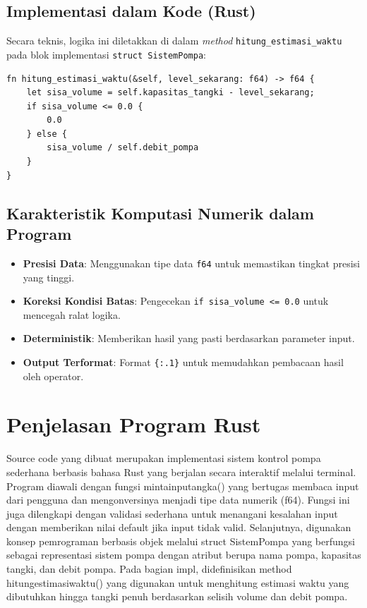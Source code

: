\documentclass[12pt,a4paper]{article}
\begin{document}
\subsection*{Implementasi dalam Kode (Rust)}
Secara teknis, logika ini diletakkan di dalam \textit{method} \texttt{hitung\_estimasi\_waktu} pada blok implementasi \texttt{struct SistemPompa}:

\begin{lstlisting}
fn hitung_estimasi_waktu(&self, level_sekarang: f64) -> f64 {
    let sisa_volume = self.kapasitas_tangki - level_sekarang; 
    if sisa_volume <= 0.0 {
        0.0 
    } else {
        sisa_volume / self.debit_pompa 
    }
}
\end{lstlisting}

\subsection*{Karakteristik Komputasi Numerik dalam Program}
\begin{itemize}
    \item \textbf{Presisi Data}: Menggunakan tipe data \texttt{f64} untuk memastikan tingkat presisi yang tinggi.
    \item \textbf{Koreksi Kondisi Batas}: Pengecekan \texttt{if sisa\_volume <= 0.0} untuk mencegah ralat logika.
    \item \textbf{Deterministik}: Memberikan hasil yang pasti berdasarkan parameter input.
    \item \textbf{Output Terformat}: Format \texttt{\{:.1\}} untuk memudahkan pembacaan hasil oleh operator.
\end{itemize}

\section{Penjelasan Program Rust}
Source code yang dibuat merupakan implementasi sistem kontrol pompa sederhana berbasis bahasa Rust yang berjalan secara interaktif melalui terminal. Program diawali dengan fungsi mintainputangka() yang bertugas membaca input dari pengguna dan mengonversinya menjadi tipe data numerik (f64). Fungsi ini juga dilengkapi dengan validasi sederhana untuk menangani kesalahan input dengan memberikan nilai default jika input tidak valid. Selanjutnya, digunakan konsep pemrograman berbasis objek melalui struct SistemPompa yang berfungsi sebagai representasi sistem pompa dengan atribut berupa nama pompa, kapasitas tangki, dan debit pompa. Pada bagian impl, didefinisikan method hitungestimasiwaktu() yang digunakan untuk menghitung estimasi waktu yang dibutuhkan hingga tangki penuh berdasarkan selisih volume dan debit pompa.
\end{document}
